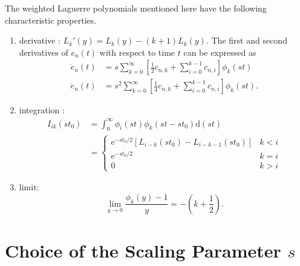 \documentclass[conference, a4paper]{IEEEtran}
\begin{document}
The weighted Laguerre polynomials mentioned here have the following
characteristic properties.
\begin{enumerate}
\item derivative \cite{jung:time:2003}: $L_k'(y)=L_k(y)-(k+1)L_k(y)$. The first and second
derivatives of $e_n(t)$ with respect to time $t$ can be expressed as
\begin{equation}
\begin{split}
\dot{e}_n(t)&=s\sum _{k=0}^{\infty}\left [\frac{1}{2}c_{n,k}+\sum
_{i=0}^{k-1}c_{n,i}\right ]\phi _k(st) \\
\ddot{e}_n(t)&=s^2\sum _{k=0}^{\infty}\left [\frac{1}{4}c_{n,k}+\sum
_{i=0}^{k-1}c_{n,i}\right ]\phi _k(st).
\end{split}
\end{equation}
\item integration \cite{gradshteyn:table:1980}:
\begin{equation}
\begin{split}
I_{ik}(st_0)&=\int
_0^{\infty}\phi_i(st)\phi_k(st-st_0)\mathrm{d}(st) \\
&=\begin{cases}\mathrm{e}^{-st_0/2}[L_{i-k}(st_0)-L_{i-k-1}(st_0)]&k<i\\
    \mathrm{e}^{-st_0/2}&k=i\\
    0&k>i\end{cases}
\end{split}
\end{equation}
\item limit: 
\begin{equation}
\lim _{y\rightarrow 0}\frac{\phi_k(y)-1}{y}=-(k+\frac{1}{2}).
\end{equation}
\end{enumerate}

\section{Choice of the Scaling Parameter $s$}
\end{document}
